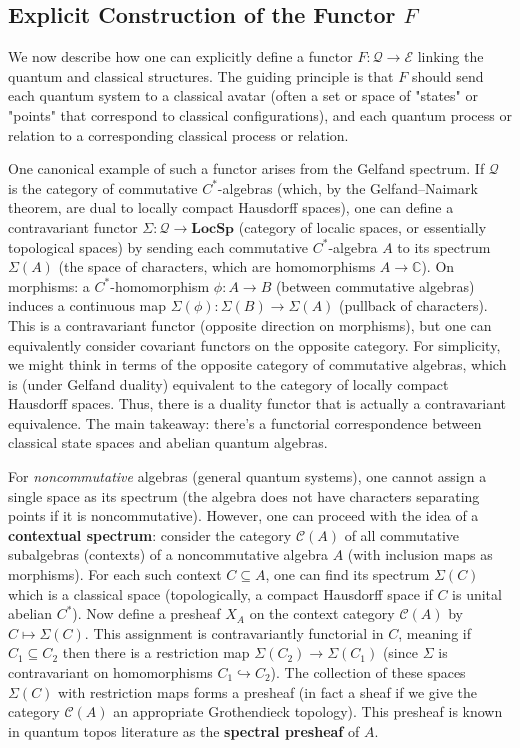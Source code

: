 \subsection{Explicit Construction of the Functor $F$}

We now describe how one can explicitly define a functor $F: \mathcal{Q} \to \mathcal{E}$ linking the quantum and classical structures. The guiding principle is that $F$ should send each quantum system to a classical avatar (often a set or space of "states" or "points" that correspond to classical configurations), and each quantum process or relation to a corresponding classical process or relation.

\medskip

One canonical example of such a functor arises from the Gelfand spectrum. If $\mathcal{Q}$ is the category of commutative $C^*$-algebras (which, by the Gelfand–Naimark theorem, are dual to locally compact Hausdorff spaces), one can define a contravariant functor $\Sigma: \mathcal{Q} \to \mathbf{LocSp}$ (category of localic spaces, or essentially topological spaces) by sending each commutative $C^*$-algebra $A$ to its spectrum $\Sigma(A)$ (the space of characters, which are homomorphisms $A\to \mathbb{C}$). On morphisms: a $C^*$-homomorphism $\phi: A \to B$ (between commutative algebras) induces a continuous map $\Sigma(\phi): \Sigma(B) \to \Sigma(A)$ (pullback of characters). This is a contravariant functor (opposite direction on morphisms), but one can equivalently consider covariant functors on the opposite category. For simplicity, we might think in terms of the opposite category of commutative algebras, which is (under Gelfand duality) equivalent to the category of locally compact Hausdorff spaces. Thus, there is a duality functor that is actually a contravariant equivalence. The main takeaway: there's a functorial correspondence between classical state spaces and abelian quantum algebras.

\medskip

For \emph{noncommutative} algebras (general quantum systems), one cannot assign a single space as its spectrum (the algebra does not have characters separating points if it is noncommutative). However, one can proceed with the idea of a \textbf{contextual spectrum}: consider the category $\mathcal{C}(A)$ of all commutative subalgebras (contexts) of a noncommutative algebra $A$ (with inclusion maps as morphisms). For each such context $C \subseteq A$, one can find its spectrum $\Sigma(C)$ which is a classical space (topologically, a compact Hausdorff space if $C$ is unital abelian $C^*$). Now define a presheaf $X_A$ on the context category $\mathcal{C}(A)$ by $C \mapsto \Sigma(C)$. This assignment is contravariantly functorial in $C$, meaning if $C_1 \subseteq C_2$ then there is a restriction map $\Sigma(C_2) \to \Sigma(C_1)$ (since $\Sigma$ is contravariant on homomorphisms $C_1 \hookrightarrow C_2$). The collection of these spaces ${\Sigma(C)}$ with restriction maps forms a presheaf (in fact a sheaf if we give the category $\mathcal{C}(A)$ an appropriate Grothendieck topology). This presheaf is known in quantum topos literature as the \textbf{spectral presheaf} of $A$.

